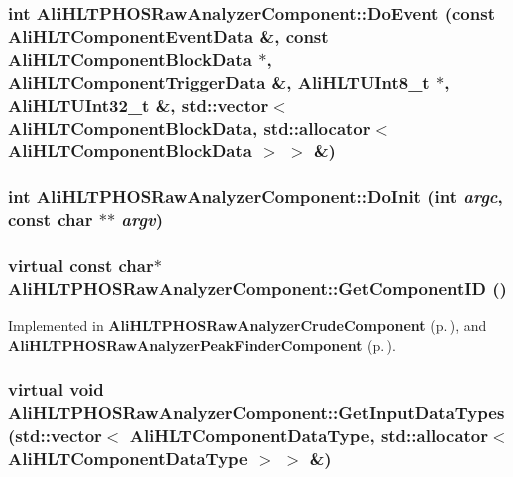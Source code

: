 \subsubsection{\setlength{\rightskip}{0pt plus 5cm}int Ali\-HLTPHOSRaw\-Analyzer\-Component::Do\-Event (const Ali\-HLTComponent\-Event\-Data \&, const Ali\-HLTComponent\-Block\-Data $\ast$, Ali\-HLTComponent\-Trigger\-Data \&, Ali\-HLTUInt8\_\-t $\ast$, Ali\-HLTUInt32\_\-t \&, std::vector$<$ Ali\-HLTComponent\-Block\-Data, std::allocator$<$ Ali\-HLTComponent\-Block\-Data $>$ $>$ \&)\hspace{0.3cm}{\tt  [virtual]}}\label{classAliHLTPHOSRawAnalyzerComponent_a12}


\subsubsection{\setlength{\rightskip}{0pt plus 5cm}int Ali\-HLTPHOSRaw\-Analyzer\-Component::Do\-Init (int {\em argc}, const char $\ast$$\ast$ {\em argv})\hspace{0.3cm}{\tt  [virtual]}}\label{classAliHLTPHOSRawAnalyzerComponent_a4}


\subsubsection{\setlength{\rightskip}{0pt plus 5cm}virtual const char$\ast$ Ali\-HLTPHOSRaw\-Analyzer\-Component::Get\-Component\-ID ()\hspace{0.3cm}{\tt  [pure virtual]}}\label{classAliHLTPHOSRawAnalyzerComponent_a7}




Implemented in {\bf Ali\-HLTPHOSRaw\-Analyzer\-Crude\-Component} {\rm (p.\,\pageref{classAliHLTPHOSRawAnalyzerCrudeComponent_a4})}, and {\bf Ali\-HLTPHOSRaw\-Analyzer\-Peak\-Finder\-Component} {\rm (p.\,\pageref{classAliHLTPHOSRawAnalyzerPeakFinderComponent_a4})}.
\subsubsection{\setlength{\rightskip}{0pt plus 5cm}virtual void Ali\-HLTPHOSRaw\-Analyzer\-Component::Get\-Input\-Data\-Types (std::vector$<$ Ali\-HLTComponent\-Data\-Type, std::allocator$<$ Ali\-HLTComponent\-Data\-Type $>$ $>$ \&)\hspace{0.3cm}{\tt  [virtual]}}\label{classAliHLTPHOSRawAnalyzerComponent_a8}


